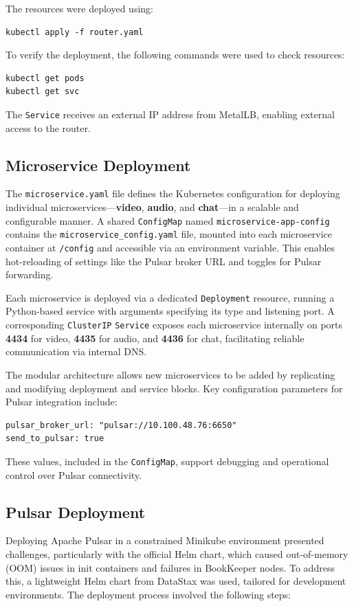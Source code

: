 The resources were deployed using:

\begin{lstlisting}
kubectl apply -f router.yaml
\end{lstlisting}

To verify the deployment, the following commands were used to check resources:

\begin{lstlisting}
kubectl get pods
kubectl get svc
\end{lstlisting}

The \texttt{Service} receives an external IP address from MetalLB, enabling external access to the router.

\subsection{Microservice Deployment}
The \texttt{microservice.yaml} file defines the Kubernetes configuration for deploying individual microservices—\textbf{video}, \textbf{audio}, and \textbf{chat}—in a scalable and configurable manner. A shared \texttt{ConfigMap} named \texttt{microservice-app-config} contains the \texttt{microservice\_config.yaml} file, mounted into each microservice container at \texttt{/config} and accessible via an environment variable. This enables hot-reloading of settings like the Pulsar broker URL and toggles for Pulsar forwarding.

Each microservice is deployed via a dedicated \texttt{Deployment} resource, running a Python-based service with arguments specifying its type and listening port. A corresponding \texttt{ClusterIP} \texttt{Service} exposes each microservice internally on ports \textbf{4434} for video, \textbf{4435} for audio, and \textbf{4436} for chat, facilitating reliable communication via internal DNS.

The modular architecture allows new microservices to be added by replicating and modifying deployment and service blocks. Key configuration parameters for Pulsar integration include:

\begin{lstlisting}
pulsar_broker_url: "pulsar://10.100.48.76:6650"
send_to_pulsar: true
\end{lstlisting}

These values, included in the \texttt{ConfigMap}, support debugging and operational control over Pulsar connectivity.

\subsection{Pulsar Deployment}
Deploying Apache Pulsar in a constrained Minikube environment presented challenges, particularly with the official Helm chart, which caused out-of-memory (OOM) issues in init containers and failures in BookKeeper nodes. To address this, a lightweight Helm chart from DataStax was used, tailored for development environments. The deployment process involved the following steps:

